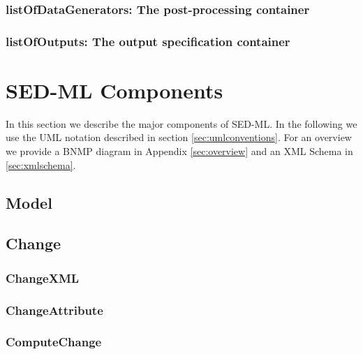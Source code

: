  \subsubsection{listOfDataGenerators: The post-processing container}
 

 \subsubsection{listOfOutputs: The output specification container}
 



\section{SED-ML Components}
In this section we describe the major components of SED-ML. In the following we 
use the UML notation described in section \ref{sec:umlconventions}. For an overview we 
provide a BNMP diagram in Appendix \ref{sec:overview} and an XML Schema in 
\ref{sec:xmlschema}. 

  \subsection{Model}
  

  \subsection{Change}
  

  \subsubsection{ChangeXML}
  

  \subsubsection{ChangeAttribute}
  

  \subsubsection{ComputeChange}
  

